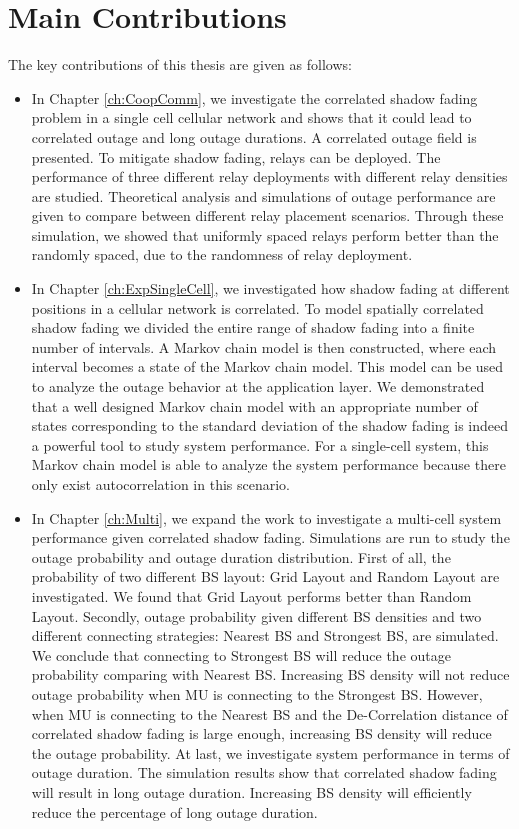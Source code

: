 \section{Main Contributions}
\par The key contributions of this thesis are given as follows:
\begin{itemize}
\item In Chapter \ref{ch:CoopComm}, we investigate the correlated shadow fading problem in a single cell cellular network and shows that it could lead to correlated outage and long outage durations. A correlated outage field is presented. To mitigate shadow fading, relays can be deployed. The performance of three different relay deployments with different relay densities are studied. Theoretical analysis and simulations of outage performance are given to compare between different relay placement scenarios. Through these simulation, we showed that uniformly spaced relays perform better than the randomly spaced, due to the randomness of relay deployment. 
\item In Chapter \ref{ch:ExpSingleCell}, we investigated how shadow fading at different positions in a cellular network is correlated. To model spatially correlated shadow fading we divided the entire range of shadow fading into a finite number of intervals. A Markov chain model is then constructed, where each interval becomes a state of the Markov chain model. This model can be used to analyze the  outage behavior at the application layer. We demonstrated that a well designed Markov chain model with an appropriate number of states corresponding to the standard deviation of the shadow fading is indeed a powerful tool to study system performance. For a single-cell system, this Markov chain model is able to analyze the system performance because there only exist autocorrelation in this scenario. 
\item In Chapter \ref{ch:Multi}, we expand the work to investigate a multi-cell system performance given correlated shadow fading. Simulations are run to study the outage probability and outage duration distribution. First of all, the probability of two different BS layout: Grid Layout and Random Layout are investigated. We found that Grid Layout performs better than Random Layout. Secondly, outage probability given different BS densities and two different connecting strategies: Nearest BS and Strongest BS, are simulated. We conclude that connecting to Strongest BS will reduce the outage probability comparing with Nearest BS. Increasing BS density will not reduce outage probability when MU is connecting to the Strongest BS. However, when MU is connecting to the Nearest BS and the De-Correlation distance of correlated shadow fading is large enough, increasing BS density will reduce the outage probability. At last, we investigate system performance in terms of outage duration. The simulation results show that correlated shadow fading will result in long outage duration. Increasing BS density will efficiently reduce the percentage of long outage duration.

\end{itemize}
